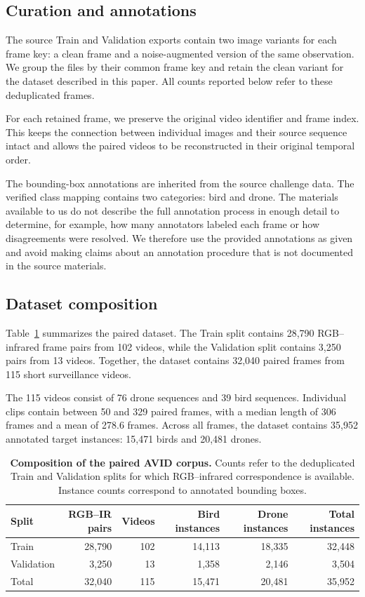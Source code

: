 \documentclass[10pt]{article}
\newcommand{\dataset}{\textsc{AVID}}
\begin{document}
\subsection{Curation and annotations}

The source Train and Validation exports contain two image variants for each frame key: a clean frame and a noise-augmented version of the same observation. We group the files by their common frame key and retain the clean variant for the dataset described in this paper. All counts reported below refer to these deduplicated frames.

For each retained frame, we preserve the original video identifier and frame index. This keeps the connection between individual images and their source sequence intact and allows the paired videos to be reconstructed in their original temporal order.

The bounding-box annotations are inherited from the source challenge data. The verified class mapping contains two categories: bird and drone. The materials available to us do not describe the full annotation process in enough detail to determine, for example, how many annotators labeled each frame or how disagreements were resolved. We therefore use the provided annotations as given and avoid making claims about an annotation procedure that is not documented in the source materials.

\subsection{Dataset composition}

Table~\ref{tab:corpus} summarizes the paired dataset. The Train split contains 28,790 RGB--infrared frame pairs from 102 videos, while the Validation split contains 3,250 pairs from 13 videos. Together, the dataset contains 32,040 paired frames from 115 short surveillance videos.

The 115 videos consist of 76 drone sequences and 39 bird sequences. Individual clips contain between 50 and 329 paired frames, with a median length of 306 frames and a mean of 278.6 frames. Across all frames, the dataset contains 35,952 annotated target instances: 15,471 birds and 20,481 drones.

\begin{table}[t]
\centering
\caption{\textbf{Composition of the paired \dataset{} corpus.}
Counts refer to the deduplicated Train and Validation splits for which RGB--infrared correspondence is available. Instance counts correspond to annotated bounding boxes.}
\label{tab:corpus}
\small
\begin{tabular}{lrrrrr}
\toprule
Split & RGB--IR pairs & Videos & Bird instances & Drone instances & Total instances \\
\midrule
Train      & 28,790 & 102 & 14,113 & 18,335 & 32,448 \\
Validation & 3,250  & 13  & 1,358  & 2,146  & 3,504  \\
\midrule
Total      & 32,040 & 115 & 15,471 & 20,481 & 35,952 \\
\bottomrule
\end{tabular}
\end{table}
\end{document}
